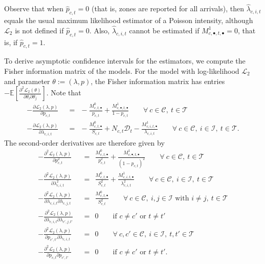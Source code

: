 Observe that when $\hat{p}_{c,t} = 0$ (that is, zones are reported for all arrivals), then $\hat{\lambda}_{c,i,t}$ equals the usual maximum likelihood estimator of a Poisson intensity, although $\mathscr{L}_{2}$ is not defined if $\hat{p}_{c,t} = 0$.
Also, $\hat{\lambda}_{c,i,t}$ cannot be estimated if $M_{c,\bullet,t,\bullet}^{1} = 0$, that is, if $\hat{p}_{c,t} = 1$.

To derive asymptotic confidence intervals for the estimators, we compute the Fisher information matrix of the models.
For the model with log-likelihood $\mathscr{L}_{2}$ and parameter $\theta := (\lambda,p)$, the Fisher information matrix has entries $-\mathbb{E}\left[\frac{\partial^2 \mathscr{L}_{2}(\theta)}{\partial \theta_{i} \partial \theta_{j}}\right]$.
Note that
\begin{align*}
-\frac{\partial \mathscr{L}_{2}(\lambda,p)}{\partial p_{c,t}} \ \ & = \ \ -\frac{M_{c,t,\bullet}^{0}}{p_{c,t}}+\frac{M_{c,\bullet,t,\bullet}^{1}}{1-p_{c,t}} \qquad \forall \ c \in \mathcal{C}, \ t \in \mathcal{T} \\
-\frac{\partial \mathscr{L}_{2}(\lambda,p)}{\partial \lambda_{c,i,t}} \ \ & = \ \ -\frac{M_{c,t,\bullet}^{0}}{S_{c,t}} + N_{c,t} \mathcal{D}_{t} - \frac{M_{c,i,t,\bullet}^{1}}{\lambda_{c,i,t}} \qquad \forall \ c \in \mathcal{C}, \ i \in \mathcal{I}, \ t \in \mathcal{T}.
\end{align*}
The second-order derivatives are therefore given by
\begin{align*}
-\frac{\partial^2 \mathscr{L}_{2}(\lambda,p)}{\partial p_{c,t}^2} \ \ & = \ \ \frac{M_{c,t,\bullet}^{0}}{p_{c,t}^2} + \frac{M_{c,\bullet,t,\bullet}^{1}}{(1-p_{c,t})^2} \qquad \forall \ c \in \mathcal{C}, \ t \in \mathcal{T} \\
-\frac{\partial^2 \mathscr{L}_{2}(\lambda,p)}{\partial \lambda_{c,i,t}^2} \ \ & = \ \ \frac{M_{c,t,\bullet}^{0}}{S_{c,t}^2} + \frac{M_{c,i,t,\bullet}^{1}}{\lambda_{c,i,t}^2} \qquad \forall \ c \in \mathcal{C}, \ i \in \mathcal{I}, \ t \in \mathcal{T} \\
-\frac{\partial^2 \mathscr{L}_{2}(\lambda,p)}{\partial \lambda_{c,i,t} \partial \lambda_{c,j,t}} \ \ & = \ \ \frac{M_{c,t,\bullet}^{0}}{S_{c,t}^2} \qquad \forall \ c \in \mathcal{C}, \ i,j \in \mathcal{I} \mbox{ with } i \neq j, \ t \in \mathcal{T} \\
-\frac{\partial^2 \mathscr{L}_{2}(\lambda,p)}{\partial \lambda_{c,i,t} \partial \lambda_{c',j,t'}} \ \ & = \ \ 0 \qquad \mbox{if } c \neq c' \mbox{ or } t \neq t' \\
-\frac{\partial^2 \mathscr{L}_{2}(\lambda,p)}{\partial p_{c',t'} \partial \lambda_{c,i,t}} \ \ & = \ \ 0 \qquad \forall \ c,c' \in \mathcal{C}, \ i \in \mathcal{I}, \ t,t' \in \mathcal{T} \\
-\frac{\partial^2 \mathscr{L}_{2}(\lambda,p)}{\partial p_{c,t} \partial p_{c',t'}} \ \ & = \ \ 0 \qquad \mbox{if } c \neq c' \mbox{ or } t \neq t'.
\end{align*}
